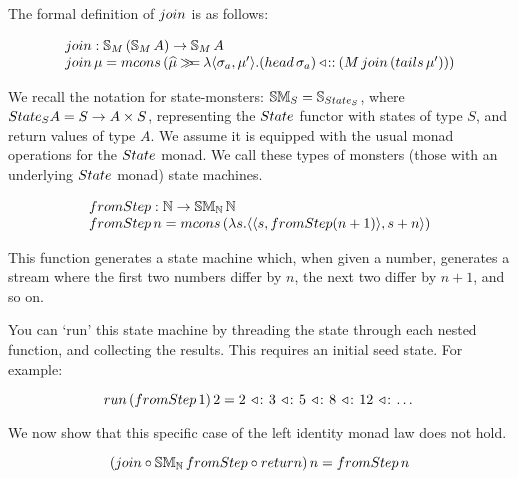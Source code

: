 The formal definition of $\join$ is as follows:

$$
\begin{array}{l}
\join : \stream{M}\,(\stream{M}\,A) \rightarrow \stream{M}\,A\\
\join\,\mu = \mcons\,(\unc{\mu} \bind \lambda \pair{\sigma_a}{\mu'}.
              (\head\,\sigma_a) \fcons (M\,\join\,(\tails\,\mu')))
\end{array}
$$




We recall the notation for state-monsters: $\stmon{S} = \stream{\state_S}$, where $\state_S A = S \rightarrow A \times S$, representing the $\state$ functor with states of type $S$, and return values of type $A$. 
We assume it is equipped with the usual monad operations for the $\state$ monad. We call these types of monsters (those with an underlying $\state$ monad) state machines.

$$
\begin{array}{l}
\fromstepstr : \nat \rightarrow \stmon{\nat}\,\nat \\
\fromstepstr\, n = \mcons\, (\lambda s. \pair{\pair{s}{\fromstepstr (n + 1)}}{s + n})
\end{array}
$$

This function generates a state machine which, when given a number, generates a stream where the first two numbers differ by $n$, the next two differ by $n + 1$, and so on.

You can `run' this state machine by threading the state through each nested function, and collecting the results. This requires an initial seed state. For example:

$$
\strun\,(\fromstepstr\, 1)\, 2 = 2\, \acons\, 3\, \acons\, 5\, \acons\, 8\, \acons\, 12\, \acons\, \dots
$$

We now show that this specific case of the left identity monad law does not hold. 

$$
(\join \comp \stmon{\nat}\, \fromstepstr \comp \return)\, n = \fromstepstr\, n
$$



